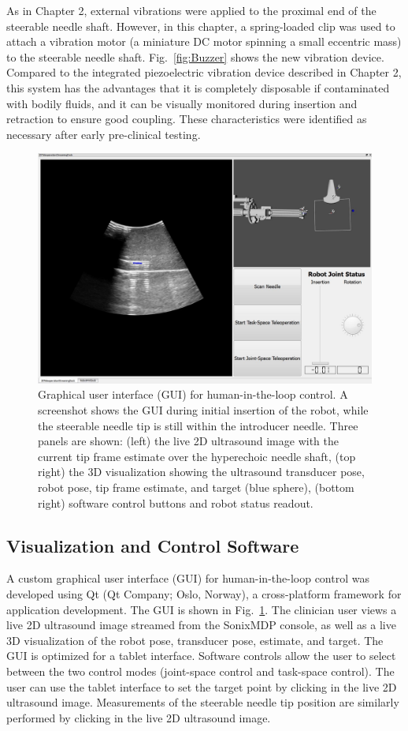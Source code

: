 As in Chapter 2, external vibrations were applied to the proximal end of the steerable needle shaft. However, in this chapter, a spring-loaded clip was used to attach a vibration motor (a miniature DC motor spinning a small eccentric mass) to the steerable needle shaft. Fig.~\ref{fig:Buzzer} shows the new vibration device. Compared to the integrated piezoelectric vibration device described in Chapter 2, this system has the advantages that it is completely disposable if contaminated with bodily fluids, and it can be visually monitored during insertion and retraction to ensure good coupling. These characteristics were identified as necessary after early pre-clinical testing.

\begin{figure}[!t]
\centering
\includegraphics[width = 0.9\columnwidth]{./Images/Chapter5/GUI/GUI.jpg}%
\caption[Human-in-the-loop GUI]{Graphical user interface (GUI) for human-in-the-loop control. A screenshot shows the GUI during initial insertion of the robot, while the steerable needle tip is still within the introducer needle. Three panels are shown: (left) the live 2D ultrasound image with the current tip frame estimate over the hyperechoic needle shaft, (top right) the 3D visualization showing the ultrasound transducer pose, robot pose, tip frame estimate, and target (blue sphere), (bottom right) software control buttons and robot status readout.}
\label{fig:GUI}
\end{figure}  

\subsection{Visualization and Control Software}
A custom graphical user interface (GUI) for human-in-the-loop control was developed using Qt (Qt Company; Oslo, Norway), a cross-platform framework for application development. The GUI is shown in Fig.~\ref{fig:GUI}. The clinician user views a live 2D ultrasound image streamed from the SonixMDP console, as well as a live 3D visualization of the robot pose, transducer pose, estimate, and target. The GUI is optimized for a tablet interface. Software controls allow the user to select between the two control modes (joint-space control and task-space control). The user can use the tablet interface to set the target point by clicking in the live 2D ultrasound image. Measurements of the steerable needle tip position are similarly performed by clicking in the live 2D ultrasound image. 


